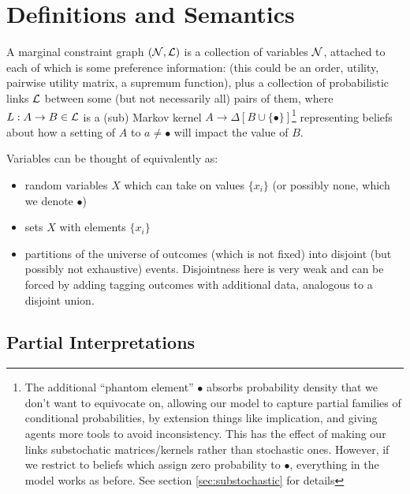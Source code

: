 \documentclass{article}
\begin{document}
	\section{Definitions and Semantics}
	\begin{defn*}\label{def:pcg-semiformal}
		A marginal constraint graph $(\cal N, L)$ is a collection of variables $\cal N$, attached to each of which is some preference information: (this could be an order, utility, pairwise utility matrix, a supremum function), plus a collection of probabilistic links $\cal L$ between some (but not necessarily all) pairs of them, where $L: A\to B \in \cal L$ is a (sub) Markov kernel $A \to \Delta [B \cup \{\bullet\}]$\footnote{The additional ``phantom element'' $\bullet$ absorbs probability density that we don't want to equivocate on, allowing our model to capture partial families of conditional probabilities, by extension things like implication, and giving agents more tools to avoid inconsistency. This has the effect of making our links substochatic matrices/kernels rather than stochastic ones. However, if we restrict to beliefs which assign zero probability to $\bullet$, everything in the model works as before. See section \ref{sec:substochastic} for details} representing beliefs about how a setting of $A$ to $a \neq \bullet$ will impact the value of $B$. 
	\end{defn*}
	
	Variables can be thought of equivalently as:
	\begin{itemize}[nosep]
		\item random variables $X$ which can take on values $\{x_i\}$ (or possibly none, which we denote $\bullet$)
		\item sets $X$ with elements $\{x_i\}$
		\item partitions of the universe of outcomes (which is not fixed) into disjoint (but possibly not exhaustive) events. Disjointness here is very weak and can be forced by adding tagging outcomes with additional data, analogous to a disjoint union.
	\end{itemize}
	
	
	\subsection{Partial Interpretations}
	
\end{document}
